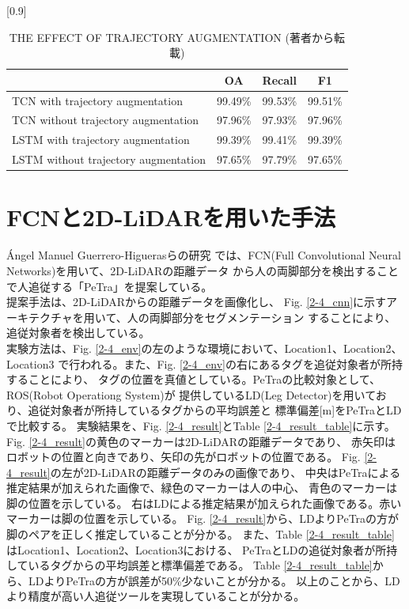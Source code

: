 \begin{table}[b]
  \begin{center}
    \caption{{THE EFFECT OF TRAJECTORY AUGMENTATION (著者\cite{Temporal convolutional networks for multi-person activity recognition using a 2D LIDAR}から転載)}
    \label{2-2_THE EFFECT OF TRAJECTORY AUGMENTATION}}
    \scalebox{1.0}[0.9]{
      \begin{tabular}{l|c|c|c} \hline
        & OA & Recall & F1 \\ \hline
        TCN with trajectory augmentation & 99.49\% & 99.53\% & 99.51\% \\ \hline
        TCN without trajectory augmentation & 97.96\% & 97.93\% & 97.96\% \\ \hline
        LSTM with trajectory augmentation & 99.39\% & 99.41\% & 99.39\% \\ \hline
        LSTM without trajectory augmentation & 97.65\% & 97.79\% & 97.65\% \\ \hline
      \end{tabular}
    }
  \end{center}
\end{table}

\clearpage

\section{FCNと2D-LiDARを用いた手法}
Ángel Manuel Guerrero-Higuerasらの研究
\cite{Tracking People in a Mobile Robot From 2D LIDAR Scans Using Full Convolutional Neural Networks for Security in Cluttered Environments}
では、FCN(Full Convolutional Neural Networks)を用いて、2D-LiDARの距離データ
から人の両脚部分を検出することで人追従する「PeTra」を提案している。\\ \indent
提案手法は、2D-LiDARからの距離データを画像化し、
Fig. \ref{2-4_cnn}に示すアーキテクチャを用いて、人の両脚部分をセグメンテーション
することにより、追従対象者を検出している。\\ \indent
実験方法は、Fig. \ref{2-4_env}の左のような環境において、Location1、Location2、Location3
で行われる。また、Fig. \ref{2-4_env}の右にあるタグを追従対象者が所持することにより、
タグの位置を真値としている。PeTraの比較対象として、ROS(Robot Operationg System)が
提供しているLD(Leg Detector)を用いており、追従対象者が所持しているタグからの平均誤差と
標準偏差[m]をPeTraとLDで比較する。
実験結果を、Fig. \ref{2-4_result}とTable \ref{2-4_result_table}に示す。
Fig. \ref{2-4_result}の黄色のマーカーは2D-LiDARの距離データであり、
赤矢印はロボットの位置と向きであり、矢印の先がロボットの位置である。
Fig. \ref{2-4_result}の左が2D-LiDARの距離データのみの画像であり、
中央はPeTraによる推定結果が加えられた画像で、緑色のマーカーは人の中心、
青色のマーカーは脚の位置を示している。
右はLDによる推定結果が加えられた画像である。赤いマーカーは脚の位置を示している。
Fig. \ref{2-4_result}から、LDよりPeTraの方が脚のペアを正しく推定していることが分かる。
また、Table \ref{2-4_result_table}はLocation1、Location2、Location3における、
PeTraとLDの追従対象者が所持しているタグからの平均誤差と標準偏差である。
Table \ref{2-4_result_table}から、LDよりPeTraの方が誤差が50\%少ないことが分かる。
以上のことから、LDより精度が高い人追従ツールを実現していることが分かる。

